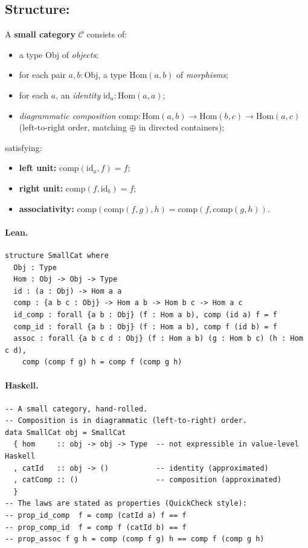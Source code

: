 \documentclass[11pt,a4paper]{article}
\begin{document}
\subsection{Structure: }

\begin{defn}
A \textbf{small category} $\mathcal{C}$ consists of:
\begin{itemize}
  \item a type $\mathrm{Obj}$ of \emph{objects};
  \item for each pair $a, b : \mathrm{Obj}$, a type $\mathrm{Hom}(a, b)$ of
        \emph{morphisms};
  \item for each $a$, an \emph{identity} $\mathrm{id}_a : \mathrm{Hom}(a, a)$;
  \item \emph{diagrammatic composition}
        $\mathrm{comp} : \mathrm{Hom}(a,b) \to \mathrm{Hom}(b,c) \to
        \mathrm{Hom}(a,c)$
        (left-to-right order, matching $\oplus$ in directed containers);
\end{itemize}
satisfying:
\begin{itemize}
  \item \textbf{left unit:} $\mathrm{comp}(\mathrm{id}_a, f) = f$;
  \item \textbf{right unit:} $\mathrm{comp}(f, \mathrm{id}_b) = f$;
  \item \textbf{associativity:}
        $\mathrm{comp}(\mathrm{comp}(f,g), h) = \mathrm{comp}(f, \mathrm{comp}(g,h))$.
\end{itemize}
\end{defn}

\paragraph{Lean.}
\begin{lstlisting}[style=lean]
structure SmallCat where
  Obj : Type
  Hom : Obj -> Obj -> Type
  id : (a : Obj) -> Hom a a
  comp : {a b c : Obj} -> Hom a b -> Hom b c -> Hom a c
  id_comp : forall {a b : Obj} (f : Hom a b), comp (id a) f = f
  comp_id : forall {a b : Obj} (f : Hom a b), comp f (id b) = f
  assoc : forall {a b c d : Obj} (f : Hom a b) (g : Hom b c) (h : Hom c d),
    comp (comp f g) h = comp f (comp g h)
\end{lstlisting}

\paragraph{Haskell.}
\begin{lstlisting}[style=haskell]
-- A small category, hand-rolled.
-- Composition is in diagrammatic (left-to-right) order.
data SmallCat obj = SmallCat
  { hom     :: obj -> obj -> Type  -- not expressible in value-level Haskell
  , catId   :: obj -> ()           -- identity (approximated)
  , catComp :: ()                  -- composition (approximated)
  }
-- The laws are stated as properties (QuickCheck style):
-- prop_id_comp  f = comp (catId a) f == f
-- prop_comp_id  f = comp f (catId b) == f
-- prop_assoc f g h = comp (comp f g) h == comp f (comp g h)
\end{lstlisting}
\end{document}
